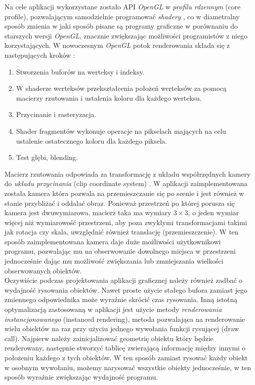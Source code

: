 \documentclass[12pt, letterpaper]{report}
\begin{document}
    Na cele aplikacji wykorzystane zostało API \emph{OpenGL} w \emph{profilu rdzennym} (core profile), 
    pozwalającym samodzielnie programować \emph{shadery} \cite{grafika3d}, co 
    w diametralny sposób zmienia w jaki sposób pisane są programy graficzne w porównaniu 
    do starszych wersji \emph{OpenGL}, znacznie zwiększając możliwości programistów z niego 
    korzystających. W nowoczesnym \emph{OpenGL} potok renderowania składa 
    się z następujących kroków \cite{grafika3d}:
    \begin{enumerate}
        \item Stworzenia buforów na werteksy i indeksy.
        \item W shaderze werteksów przekształcenia położeń werteksów 
        za pomocą macierzy rzutowania i ustalenia koloru dla każdego werteksu.
        \item Przycinanie i rasteryzacja.
        \item Shader fragmentów wykonuje operacje na pikselach mających na celu 
        ustalenie ostatecznego koloru dla każdego piksela.
        \item Test głębi, blending.
    \end{enumerate}

    Macierz rzutowania odpowiada za transformację z układu współrzędnych kamery do \emph{układu przycinania}
    (clip coordinate system) \cite{grafika3d}. W aplikacji 
    zaimplementowana została kamera która pozwala na przemieszczanie się po scenie i jest również w stanie 
    przybliżać i oddalać obraz. 
    Ponieważ przestrzeń po której porusza się
    kamera jest dwuwymiarowa, macierz taka ma wymiary $3 \times 3$, o jeden wymiar więcej niż wymiarowość 
    przestrzeni, aby poza zwykłymi transformacjami takimi jak rotacja czy skala, uwzględnić również
    translację (przemieszczenie).
    W ten sposób zaimplementowana kamera daje duże możliwości użytkownikowi programu, pozwalając 
    mu na obserwowanie dowolnego miejsca w przestrzeni jednocześnie dając mu możliwość zwiększania
    lub zmniejszania wielkości obserwowanych obiektów. \\

    Oczywiście podczas projektowania aplikacji graficznej należy również zadbać o
    wydajność rysowania obiektów. Nawet proste użycie stałego bufora zamiast jego 
    zmiennego odpowiednika może wyraźnie skrócić czas rysowania.
    Inną istotną optymalizacją zastosowaną w aplikacji jest użycie 
    metody \emph{renderowania instancjonowanego} (instanced rendering), 
    metoda pozwalająca na renderowanie wielu obiektów na raz 
    przy użyciu jednego wywołania funkcji rysującej (draw call). 
    Najpierw należy zainicjalizować geometrię obiektu który będzie renderowany, 
    następnie stworzyć tablicę zwierającą informację 
    między innymi o położeniu każdego z tych obiektów. 
    W ten sposób zamiast rysować każdy obiekt w osobnym wywołaniu, 
    możemy narysować wszystkie obiekty jednocześnie, 
    w ten sposób wyraźnie zwiększając wydajność programu.
\end{document}
